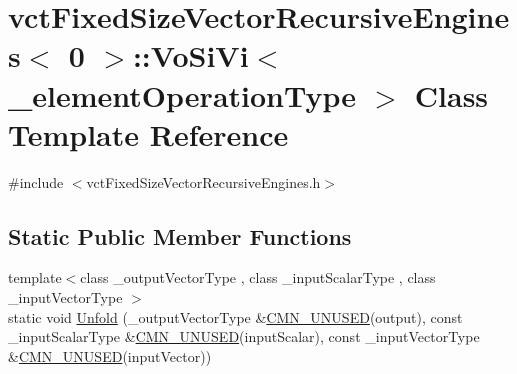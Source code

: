 \hypertarget{classvct_fixed_size_vector_recursive_engines_3_010_01_4_1_1_vo_si_vi}{\section{vct\-Fixed\-Size\-Vector\-Recursive\-Engines$<$ 0 $>$\-:\-:Vo\-Si\-Vi$<$ \-\_\-element\-Operation\-Type $>$ Class Template Reference}
\label{classvct_fixed_size_vector_recursive_engines_3_010_01_4_1_1_vo_si_vi}
}


{\ttfamily \#include $<$vct\-Fixed\-Size\-Vector\-Recursive\-Engines.\-h$>$}

\subsection*{Static Public Member Functions}
\begin{DoxyCompactItemize}
\item 
{\footnotesize template$<$class \-\_\-output\-Vector\-Type , class \-\_\-input\-Scalar\-Type , class \-\_\-input\-Vector\-Type $>$ }\\static void \hyperlink{classvct_fixed_size_vector_recursive_engines_3_010_01_4_1_1_vo_si_vi_a9d2c5c299494a7541dc7cf04645f025c}{Unfold} (\-\_\-output\-Vector\-Type \&\hyperlink{cmn_portability_8h_a021894e2626935fa2305434b1e893ff6}{C\-M\-N\-\_\-\-U\-N\-U\-S\-E\-D}(output), const \-\_\-input\-Scalar\-Type \&\hyperlink{cmn_portability_8h_a021894e2626935fa2305434b1e893ff6}{C\-M\-N\-\_\-\-U\-N\-U\-S\-E\-D}(input\-Scalar), const \-\_\-input\-Vector\-Type \&\hyperlink{cmn_portability_8h_a021894e2626935fa2305434b1e893ff6}{C\-M\-N\-\_\-\-U\-N\-U\-S\-E\-D}(input\-Vector))
\end{DoxyCompactItemize}


